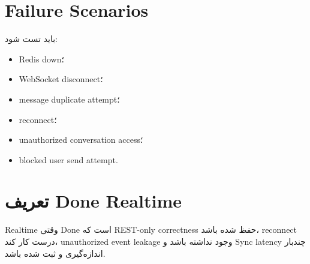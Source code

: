 \section{Failure Scenarios}

باید تست شود:
\begin{itemize}
  \item Redis down؛
  \item WebSocket disconnect؛
  \item message duplicate attempt؛
  \item reconnect؛
  \item unauthorized conversation access؛
  \item blocked user send attempt.
\end{itemize}

\section{تعریف Done Realtime}

\begin{donebox}
Realtime وقتی Done است که REST-only correctness حفظ شده باشد، reconnect درست کار کند، unauthorized event leakage وجود نداشته باشد و Sync latency چندبار اندازه‌گیری و ثبت شده باشد.
\end{donebox}
